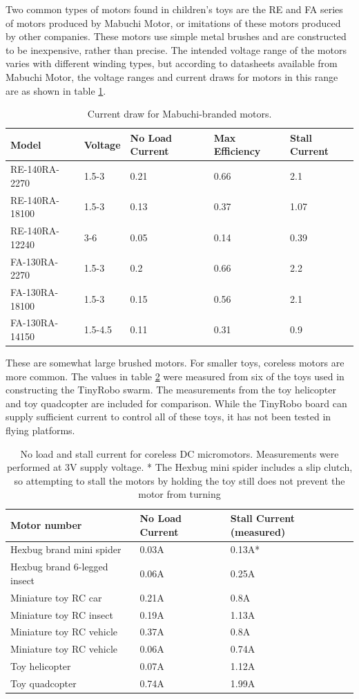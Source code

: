 \documentclass[]{article}
\begin{document}
Two common types of motors found in children's toys are the RE and FA series of motors produced by Mabuchi Motor, or imitations of these motors produced by other companies. 
These motors use simple metal brushes and are constructed to be inexpensive, rather than precise. 
The intended voltage range of the motors varies with different winding types, but according to datasheets available from Mabuchi Motor, the voltage ranges and current draws for motors in this range are as shown in table \ref{tab:properBrandedMotors}.

\begin{table}
	\begin{tabular}{l l l l l}
	Model & Voltage & No Load Current & Max Efficiency & Stall Current\\
	\hline
	RE-140RA-2270 & 1.5-3 & 0.21 & 0.66 & 2.1 \\
	RE-140RA-18100 & 1.5-3 & 0.13 & 0.37 & 1.07 \\
	RE-140RA-12240 & 3-6 & 0.05 & 0.14 & 0.39 \\
	FA-130RA-2270 & 1.5-3 & 0.2 & 0.66 & 2.2\\
	FA-130RA-18100 & 1.5-3 & 0.15 & 0.56 & 2.1\\
	FA-130RA-14150 & 1.5-4.5 & 0.11 & 0.31 & 0.9\\
	\end{tabular}
	\caption{Current draw for Mabuchi-branded motors.}
	\label{tab:properBrandedMotors}
\end{table}

These are somewhat large brushed motors. 
For smaller toys, coreless motors are more common. 
The values in table \ref{tab:coreless} were measured from six of the toys used in constructing the TinyRobo swarm.
The measurements from the toy helicopter and toy quadcopter are included for comparison.
While the TinyRobo board can supply sufficient current to control all of these toys, it has not been tested in flying platforms.

\begin{table}
	\begin{tabular}{l l l}
	Motor number & No Load Current & Stall Current (measured)\\
	\hline 
	Hexbug brand mini spider & 0.03A & 0.13A* \\
	Hexbug brand 6-legged insect & 0.06A & 0.25A \\
	Miniature toy RC car & 0.21A & 0.8A \\
	Miniature toy RC insect & 0.19A & 1.13A \\
	Miniature toy RC vehicle & 0.37A & 0.8A \\
	Miniature toy RC vehicle & 0.06A & 0.74A \\
	Toy helicopter & 0.07A & 1.12A \\
	Toy quadcopter & 0.74A & 1.99A \\
	\end{tabular}
	\caption{No load and stall current for coreless DC micromotors. Measurements were performed at 3V supply voltage. * The Hexbug mini spider includes a slip clutch, so attempting to stall the motors by holding the toy still does not prevent the motor from turning}
	\label{tab:coreless}
\end{table}
\end{document}
